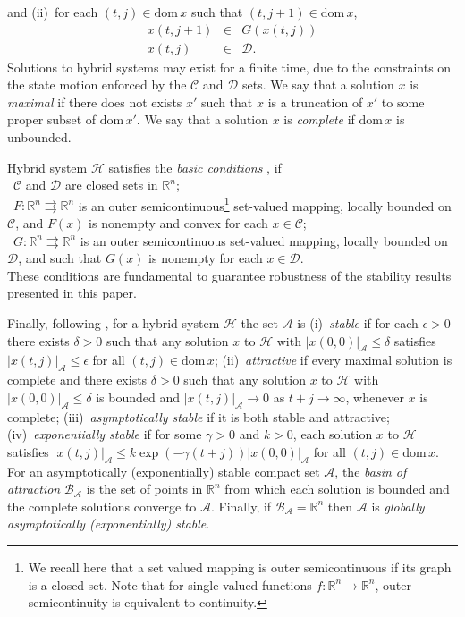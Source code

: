 \documentclass[twocolumn]{autart}
\newcommand{\realn}{\real^n}
\newcommand\real{\ensuremath{{\mathbb R}}}
\newcommand{\tto}{\ensuremath{\rightrightarrows}}
\newcommand{\dom}{\mathrm{dom}}
\begin{document}
and (ii)~for each $(t,j) \in \mathrm{dom}\,x$ such that $(t,j+1)\in \mathrm{dom}\, x$,
\begin{equation*}
\label{eq:hybsol_DG} 
\begin{array}{rcl} 
 x(t,j+1) & \in & G(x(t,j)) \\
 x(t,j)   &\in & \mathcal{D}. 
\end{array} 
\end{equation*} 
Solutions to hybrid systems may exist for a finite time,
due to the constraints on the state motion enforced by the $\mathcal{C}$ and $\mathcal{D}$
sets. We say that a solution $x$ is \emph{maximal} if there does not exists $x'$
such that $x$ is a truncation of $x'$ to some proper subset of
$\dom\,x'$. We say that a solution $x$ is 
\emph{complete} if $\mathrm{dom}\,x$ is unbounded.

{

Hybrid system $\mathcal{H}$ satisfies the 
\emph{basic conditions} \cite{GoebelCSM09},\cite{Goebel12} if \\
\textbullet~$\mathcal{C}$ and $\mathcal{D}$ are closed sets in $\realn$; \\
\textbullet~$F:\realn \tto \realn$ is an 
outer semicontinuous\footnote{We recall here that a 
set valued mapping is outer semicontinuous if its graph is a closed set.
Note that for single valued functions $f:\realn \to \realn$, outer semicontinuity is
equivalent to continuity.} set-valued mapping, locally bounded on $\mathcal{C}$, and 
$F(x)$ is nonempty and convex for each $x\in\mathcal{C}$; \\
\textbullet~$G:\realn \tto \realn$ is an outer semicontinuous set-valued mapping, 
locally bounded on $\mathcal{D}$, and such that $G(x)$ is nonempty for each $x \in\mathcal{D}$.\\
These conditions are fundamental to guarantee robustness of the stability
results presented in this paper.
} 


Finally, following \cite{GoebelCSM09}, for a hybrid system $\mathcal{H}$
the set $\mathcal{A}$ is 
(i)~\emph{stable} if for each $\epsilon > 0$ 
there exists $\delta > 0$ such that any solution $x$ to $\mathcal{H}$ 
with $|x(0,0)|_\mathcal{A}\leq \delta$ satisfies $|x(t, j)|_\mathcal{A}\leq\epsilon$ 
for all $(t, j)\in \mathrm{dom}\, x$; 
(ii)~\emph{attractive} if { every maximal solution is complete} and 
there exists $\delta > 0$
such that any solution $x$ to $\mathcal{H}$ with $|x(0,0)|_\mathcal{A}\leq \delta$
is bounded and $|x(t,j)|_\mathcal{A} \to 0$ as $t+j\to \infty$, 
whenever $x$ is complete; 
(iii)~\emph{asymptotically stable} if it is both stable and attractive;
(iv)~\emph{exponentially stable} if for some $\gamma>0$ and $k>0$, 
each solution $x$ to $\mathcal{H}$ satisfies 
$|x(t,j)|_{\mathcal{A}} \leq k \exp(-\gamma(t+j)) |x(0,0)|_{\mathcal{A}}$ for all $(t,j) \!\in\! \dom\, x$. 
For an asymptotically (exponentially) stable compact set $\mathcal{A}$, 
the \emph{basin of attraction} $\mathcal{B}_{\mathcal{A}}$ is the set of points
in $\realn$ from which each solution is bounded and the complete
solutions converge to ${\mathcal{A}}$. Finally, 
if $\mathcal{B}_{\mathcal{A}}=\realn$ then ${\mathcal{A}}$ 
is \emph{globally asymptotically (exponentially) stable}. 
\end{document}
